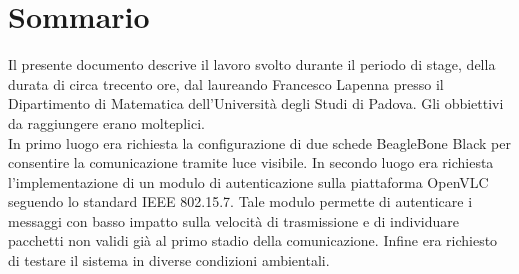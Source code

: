 \cleardoublepage
{}
{}
\begingroup
\let\clearpage\relax
\let\cleardoublepage\relax
\let\cleardoublepage\relax

\chapter*{Sommario}

Il presente documento descrive il lavoro svolto durante il periodo di stage, della durata di circa trecento ore, dal laureando Francesco Lapenna presso il Dipartimento di Matematica dell'Università degli Studi di Padova.
Gli obbiettivi da raggiungere erano molteplici.\\
In primo luogo era richiesta la configurazione di due schede BeagleBone Black per consentire la comunicazione tramite luce visibile.
In secondo luogo era richiesta l'implementazione di un modulo di autenticazione sulla piattaforma OpenVLC seguendo lo standard IEEE 802.15.7.
Tale modulo permette di autenticare i messaggi con basso impatto sulla velocità di trasmissione e di individuare pacchetti non validi già al primo stadio della comunicazione.
Infine era richiesto di testare il sistema in diverse condizioni ambientali.




\endgroup

\vfill
